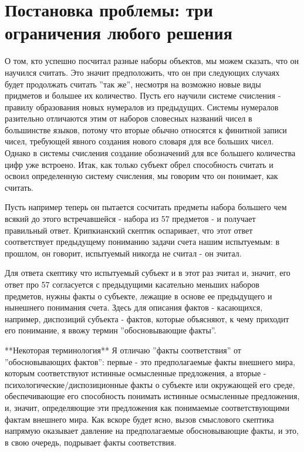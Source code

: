 \documentclass{book}
\begin{document}
\section{Постановка проблемы: три ограничения любого решения}

О том, кто успешно посчитал разные наборы объектов, мы можем сказать, что он научился считать. Это значит предположить, что он при следующих случаях будет продолжать считать ''так же'', несмотря на возможно новые виды придметов и большее их количество. Пусть его научили системе счисления - правилу образования новых нумералов из предыдущих. Системы нумералов разительно отличаются этим от наборов словесных названий чисел в большинстве языков, потому что вторые обычно относятся к финитной записи чисел, требующей явного создания нового словаря для все больших чисел. Однако в системы счисления создание обозначений для все большего количества цифр уже встроено. Итак, как только субъект обрел способность считать и освоил определенную систему счисления, мы говорим что он понимает, как считать.

Пусть например теперь он пытается сосчитать предметы набора большего чем всякий до этого встречавшейся - набора из 57 предметов - и получает правильный ответ. Крипкианский скептик оспаривает, что этот ответ соответствует предыдущему пониманию задачи счета нашим испытуемым: в прошлом, он говорит, испытуемый никогда не считал - он зчитал.

Для ответа скептику что испытуемый субъект и в этот раз зчитал и, значит, его ответ про 57 согласуется с предыдущими касательно меньших наборов предметов, нужны факты о субъекте, лежащие в основе ее предыдущего и нынешнего понимания счета. Здесь для описания фактов - касающихся, например, диспозиций субъекта - фактов, которые объясняют, к чему приходит его понимание, я ввожу термин ''обосновывающие факты''.

**Некоторая терминология** Я отличаю ''факты соответствия'' от ''обосновывающих фактов'': первые - это предполагаемые факты внешнего мира, которым соответствуют истинные осмысленные предложения, а вторые - психологические/диспозиционные факты о субъекте или окружающей его среде, обеспечивающие его способность понимать истинные осмысленные предложения, и, значит, определяющие эти предложения как понимаемые соответствующими фактам внешнего мира. Как вскоре будет ясно, вызов смыслового скептика напрямую оказывает давление на предполагаемые обосновывающие факты, и это, в свою очередь, подрывает факты соответствия.
\end{document}
